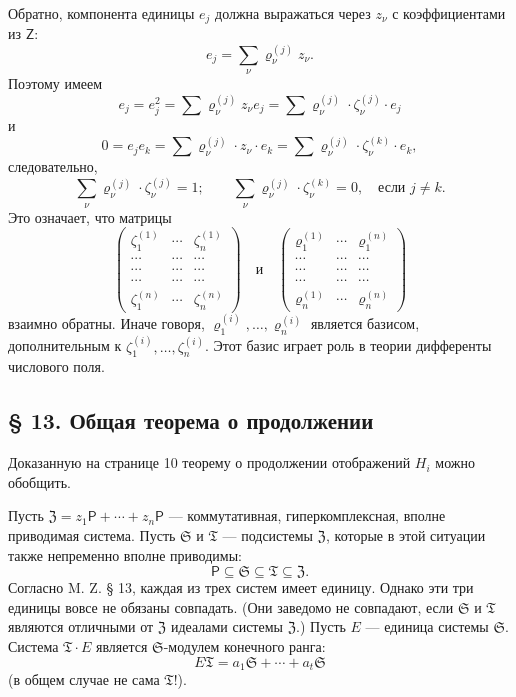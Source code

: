 \documentclass[11pt]{article}
\begin{document}
Обратно, компонента единицы \(e_j\) должна выражаться через \(z_\nu\) с коэффициентами из \(\mathsf Z\):
\[
e_j=\sum_\nu \varrho_\nu^{(j)}z_\nu .
\]
Поэтому имеем
\[
e_j=e_j^2=\sum \varrho_\nu^{(j)}z_\nu e_j
=\sum \varrho_\nu^{(j)}\cdot\zeta_\nu^{(j)}\cdot e_j
\]
и
\[
0=e_je_k=\sum \varrho_\nu^{(j)}\cdot z_\nu\cdot e_k
=\sum \varrho_\nu^{(j)}\cdot\zeta_\nu^{(k)}\cdot e_k,
\]
следовательно,
\[
\sum_\nu \varrho_\nu^{(j)}\cdot\zeta_\nu^{(j)}=1;
\qquad
\sum_\nu \varrho_\nu^{(j)}\cdot\zeta_\nu^{(k)}=0,\quad
\text{если } j\ne k.
\]
Это означает, что матрицы
\[
\begin{pmatrix}
\zeta_1^{(1)} & \cdots & \zeta_n^{(1)}\\
\cdots & \cdots & \cdots\\
\cdots & \cdots & \cdots\\
\cdots & \cdots & \cdots\\
\zeta_1^{(n)} & \cdots & \zeta_n^{(n)}
\end{pmatrix}
\quad\text{и}\quad
\begin{pmatrix}
\varrho_1^{(1)} & \cdots & \varrho_1^{(n)}\\
\cdots & \cdots & \cdots\\
\cdots & \cdots & \cdots\\
\cdots & \cdots & \cdots\\
\varrho_n^{(1)} & \cdots & \varrho_n^{(n)}
\end{pmatrix}
\]
взаимно обратны. Иначе говоря, \(\varrho_1^{(i)},\ldots,\varrho_n^{(i)}\) является базисом, дополнительным к \(\zeta_1^{(i)},\ldots,\zeta_n^{(i)}\). Этот базис играет роль в теории дифференты числового поля.

\subsection*{§ 13. Общая теорема о продолжении}\label{der-allgemeine-fortsetzungssatz}

Доказанную на странице 10 теорему о продолжении отображений \(H_i\) можно обобщить.

Пусть \(\mathfrak Z=z_1\mathsf P+\cdots+z_n\mathsf P\) --- коммутативная, гиперкомплексная, вполне приводимая система. Пусть \(\mathfrak S\) и \(\mathfrak T\) --- подсистемы \(\mathfrak Z\), которые в этой ситуации также непременно вполне приводимы:
\[
\mathsf P\subseteq\mathfrak S\subseteq\mathfrak T\subseteq\mathfrak Z .
\]
Согласно M. Z. § 13, каждая из трех систем имеет единицу. Однако эти три единицы вовсе не обязаны совпадать. (Они заведомо не совпадают, если \(\mathfrak S\) и \(\mathfrak T\) являются отличными от \(\mathfrak Z\) идеалами системы \(\mathfrak Z\).) Пусть \(E\) --- единица системы \(\mathfrak S\). Система \(\mathfrak T\cdot E\) является \(\mathfrak S\)-модулем конечного ранга:
\[
E\mathfrak T=a_1\mathfrak S+\cdots+a_t\mathfrak S
\]
(в общем случае не сама \(\mathfrak T\)!).
\end{document}
